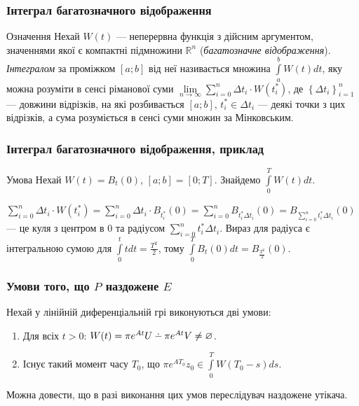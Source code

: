 \documentclass[10pt,pdf]{beamer}
\newcommand{\R}{\mathbb{R}}
\renewcommand{\l}{\left}
\renewcommand{\r}{\right}
\newcommand{\intl}{\int\limits}
\newcommand{\suml}{\sum\limits}
\def\setdif{\mathbin{\ooalign{\hss\raise1ex\hbox{.}\hss\cr
  \mathsurround=0pt$-$}}}
\begin{document}
    \begin{frame}
        \frametitle{Інтеграл багатозначного відображення}
    
        \begin{block}{Означення}
            Нехай $W(t)$ --- неперервна функція з дійсним аргументом, значеннями якої
        є компактні підмножини $\R^n$ (\emph{багатозначне відображення}).
        \emph{Інтегралом} за проміжком $[a;b]$ від неї називається множина
        $\intl_a^b W(t) dt$, яку можна розуміти в сенсі ріманової суми
        $\underset{n\to\infty}{\lim} \suml_{i=0}^n \Delta t_i\cdot W(t_i^*)$,
        де $\l\{\Delta t_i\r\}_{i=1}^n$ --- довжини відрізків, на які розбивається $[a;b]$, $t_i^* \in \Delta t_i$ ---
        деякі точки з цих відрізків, а сума розуміється в сенсі суми множин за Мінковським.
            \end{block}
    
    \end{frame}
    \begin{frame}
        \frametitle{Інтеграл багатозначного відображення, приклад}
        \begin{block}{Умова}
            Нехай $W(t) = B_t(0)$, $[a;b] = [0; T]$. Знайдемо 
            $\intl_0^T W(t) dt$.
        \end{block}
        $\suml_{i=0}^n \Delta t_i\cdot W(t_i^*) = \suml_{i=0}^n \Delta t_i\cdot B_{t_i^*}(0) = 
        \suml_{i=0}^n B_{t_i^* \Delta t_i}(0) = B_{\suml_{i=0}^n t_i^* \Delta t_i} (0)$ --- це
        куля з центром в $0$ та радіусом $\suml_{i=0}^n t_i^* \Delta t_i$. Вираз для радіуса
        є інтегральною сумою для $\intl_0^t t dt = \frac{T^2}{2}$, тому
        $\intl_0^T B_t(0) dt = B_{\frac{T^2}{2}} (0)$.
    \end{frame}
    \begin{frame}
        \frametitle{Умови того, що $P$ наздожене $E$}
    
        Нехай у лінійній диференціальній грі виконуються дві умови:
        \begin{enumerate}
            \item Для всіх $t>0$: $W(t) = \pi e^{At}U \setdif \pi e^{At}V \neq \varnothing$.
            \item Існує такий момент часу $T_0$, що $\pi e^{AT_0}z_0 \in \intl_0^T W(T_0 - s)ds$.
        \end{enumerate}

        Можна довести, що в разі виконання цих умов переслідувач наздожене утікача.
    \end{frame}
\end{document}
